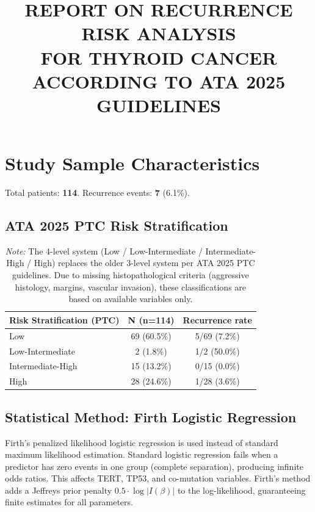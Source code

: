 \documentclass[12pt,a4paper]{article}
\title{\textbf{REPORT ON RECURRENCE RISK ANALYSIS\\FOR THYROID CANCER\\ACCORDING TO ATA 2025 GUIDELINES}}
\author{}
\date{}
\begin{document}
\maketitle
\thispagestyle{empty}
\newpage

\section{Study Sample Characteristics}
Total patients: \textbf{114}. Recurrence events: \textbf{7} (6.1\%).

\subsection{ATA 2025 PTC Risk Stratification}
\begin{table}[H]
\centering
\caption{Patient distribution by ATA 2025 PTC 4-level risk stratification}
\label{tab:ata}
\begin{tabular}{lcc}
\toprule
Risk Stratification (PTC) & N (n=114) & Recurrence rate \\
\midrule
Low                 & 69 (60.5\%)   & 5/69 (7.2\%)   \\
Low-Intermediate    & 2 (1.8\%)     & 1/2 (50.0\%)   \\
Intermediate-High   & 15 (13.2\%)   & 0/15 (0.0\%)   \\
High                & 28 (24.6\%)   & 1/28 (3.6\%)   \\
\bottomrule
\end{tabular}
\caption*{\emph{Note:} The 4-level system (Low / Low-Intermediate / Intermediate-High / High) replaces the older 3-level system per ATA 2025 PTC guidelines. Due to missing histopathological criteria (aggressive histology, margins, vascular invasion), these classifications are based on available variables only.}
\end{table}

\subsection{Statistical Method: Firth Logistic Regression}
Firth's penalized likelihood logistic regression is used instead of standard maximum likelihood estimation. Standard logistic regression fails when a predictor has zero events in one group (complete separation), producing infinite odds ratios. This affects TERT, TP53, and co-mutation variables. Firth's method adds a Jeffreys prior penalty $0.5 \cdot \log|I(\beta)|$ to the log-likelihood, guaranteeing finite estimates for all parameters.
\end{document}
